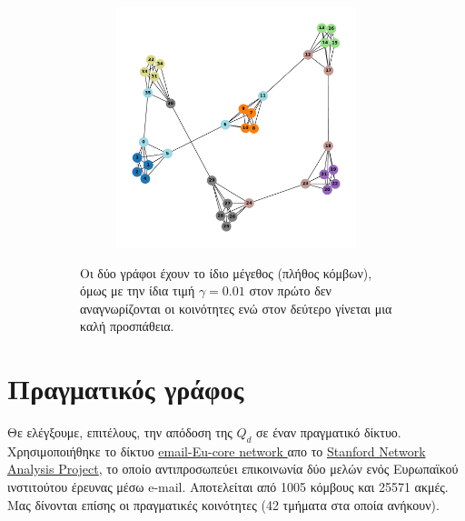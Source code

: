 \documentclass[12pt, letterpaper]{article}
\begin{document}
\begin{figure}
\begin{subfigure}{0.66\linewidth}
\begin{subfigure}{0.45\linewidth}
        \label{}
    \end{subfigure}
    \begin{subfigure}{0.45\linewidth}
        \centering
        \includegraphics[width=\linewidth]{nonconnected_ssize_dcs0.012.pdf}
        \label{}
    \end{subfigure}
    \caption{Οι δύο γράφοι έχουν το ίδιο μέγεθος (πλήθος κόμβων), όμως με την ίδια τιμή 
    $\gamma = 0.01$ στον πρώτο δεν αναγνωρίζονται οι κοινότητες ενώ στον δεύτερο γίνεται 
    μια καλή προσπάθεια.}
    \label{ss_dcs}
  \end{subfigure}
  \caption{}
  \label{endplots}
\end{figure}









\section{Πραγματικός γράφος}

Θε ελέγξουμε, επιτέλους, την απόδοση της $Q_d$ σε έναν πραγματικό δίκτυο. 
Χρησιμοποιήθηκε το δίκτυο \href{https://snap.stanford.edu/data/email-Eu-core.html}{
  \textlatin{email-Eu-core network}
} απο το \href{https://snap.stanford.edu/index.html}{\textlatin{Stanford Network Analysis Project}},
το οποίο αντιπροσωπεύει επικοινωνία δύο μελών ενός Ευρωπαϊκού ινστιτούτου
έρευνας μέσω \textlatin{e-mail}. 
Αποτελείται από 1005 κόμβους και 25571 ακμές.
Μας δίνονται επίσης οι πραγματικές κοινότητες (42 τμήματα στα οποία ανήκουν).
\end{document}
